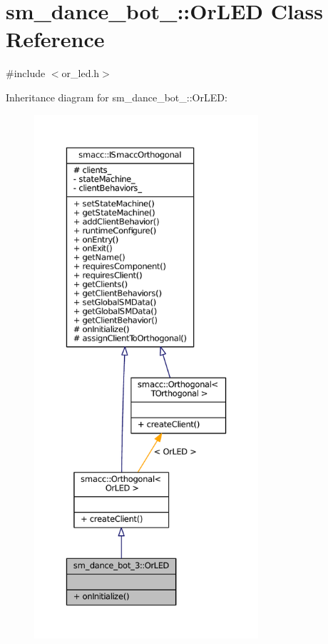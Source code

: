 \hypertarget{classsm__dance__bot__3_1_1OrLED}{}\section{sm\+\_\+dance\+\_\+bot\+\_\+:\+:Or\+L\+ED Class Reference}
\label{classsm__dance__bot__3_1_1OrLED}


{\ttfamily \#include $<$or\+\_\+led.\+h$>$}



Inheritance diagram for sm\+\_\+dance\+\_\+bot\+\_\+:\+:Or\+L\+ED\+:
\nopagebreak
\begin{figure}[H]
\begin{center}
\leavevmode
\includegraphics[height=550pt]{classsm__dance__bot__3_1_1OrLED__inherit__graph}
\end{center}
\end{figure}


